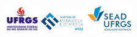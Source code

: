 \documentclass[slidestop,compress,mathserif]{beamer}
\begin{document}
{{\begin{frame}
\hfill \includegraphics[width=15mm]{../ufrgs-logo}\includegraphics[width=20mm]{../logoime}\includegraphics[width=20mm]{../sead-logo}


\end{frame}

\begin{frame}

\titlepage

\end{frame}
}
}










\end{document}

